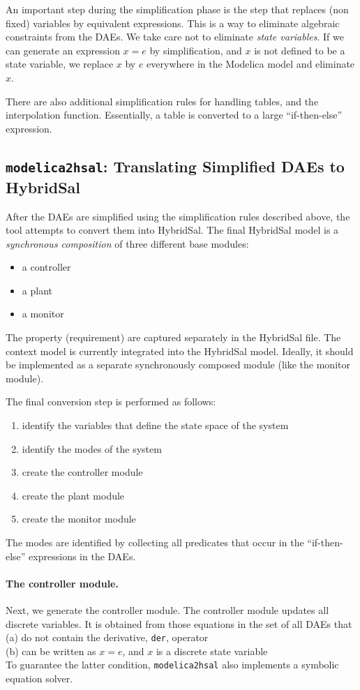 \documentclass{llncs}
\begin{document}
An important step during the simplification phase is the step that replaces
(non fixed) variables by equivalent expressions.  This is a way to eliminate
algebraic constraints from the DAEs.
We take care not to eliminate {\em{state variables}}.  If we can generate
an expression $x = e$ by simplification, and $x$ is not defined to be a state variable,
we replace $x$ by $e$ everywhere in the Modelica model and eliminate $x$.

There are also additional simplification rules for handling tables,
and the interpolation function.
Essentially, a table is converted to a large ``if-then-else'' expression.


\subsection{{\tt{modelica2hsal}}: Translating Simplified DAEs to HybridSal}

After the DAEs are simplified using the simplification rules described above,
the tool attempts to convert them into HybridSal.
The final HybridSal model is a {\em{synchronous composition}} of three different
base modules:
\begin{itemize}
\item a controller 
\item a plant 
\item a monitor
\end{itemize}
The property (requirement) are captured separately in the HybridSal file.
The context model is currently integrated into the HybridSal model.
Ideally, it should be implemented as a separate synchronously composed module
(like the monitor module).

The final conversion step is performed as follows:
\begin{enumerate}
\item
identify the variables that define the state space of the system
\item
identify the modes of the system
\item
create the controller module
\item
create the plant module
\item
create the monitor module
\end{enumerate}
The modes are identified  by collecting all predicates that occur in the 
``if-then-else'' expressions in the DAEs.

\paragraph{The controller module.}
Next, we generate the controller module.  The controller module updates
all discrete variables.  It is obtained from those equations in the
set of all DAEs that 
\\
(a) do not contain the derivative, {\tt{der}}, operator
\\
(b) can be written as $x = e$, and $x$ is a discrete state variable
\\
To guarantee the latter condition,  {\tt{modelica2hsal}} also implements
a symbolic equation solver.
\end{document}
